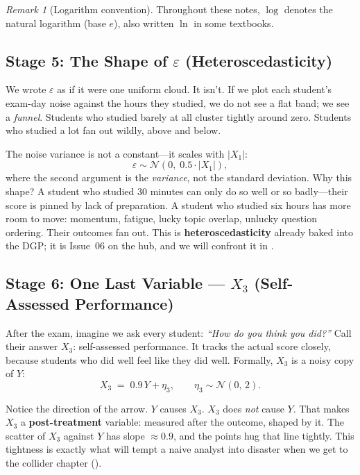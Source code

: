 \documentclass[11pt,a4paper]{article}
\theoremstyle{definition}
\theoremstyle{plain}
\theoremstyle{remark}
\newtheorem{remark}{Remark}[section]
\begin{document}
\begin{remark}[Logarithm convention]
Throughout these notes, $\log$ denotes the natural logarithm (base $e$), also written $\ln$ in some textbooks.
\end{remark}

\subsection{Stage 5: The Shape of $\varepsilon$ (Heteroscedasticity)}\label{subsec:stage-eps}

We wrote $\varepsilon$ as if it were one uniform cloud. It isn't. If we plot each student's exam-day noise against the hours they studied, we do not see a flat band; we see a \emph{funnel}. Students who studied barely at all cluster tightly around zero. Students who studied a lot fan out wildly, above and below.

The noise variance is not a constant---it scales with $|X_1|$:
\begin{equation}\label{eq:eps}
  \varepsilon \sim \mathcal{N}\!\left(0,\; 0.5 \cdot |X_1|\right),
\end{equation}
where the second argument is the \emph{variance}, not the standard deviation. Why this shape? A student who studied 30 minutes can only do so well or so badly---their score is pinned by lack of preparation. A student who studied six hours has more room to move: momentum, fatigue, lucky topic overlap, unlucky question ordering. Their outcomes fan out. This is \textbf{heteroscedasticity} already baked into the DGP; it is Issue~06 on the hub, and we will confront it in .

\subsection{Stage 6: One Last Variable --- $X_3$ (Self-Assessed Performance)}\label{subsec:stage-X3}

After the exam, imagine we ask every student: \emph{``How do you think you did?''} Call their answer $X_3$: self-assessed performance. It tracks the actual score closely, because students who did well feel like they did well. Formally, $X_3$ is a noisy copy of $Y$:
\begin{equation}\label{eq:X3}
  X_3 \;=\; 0.9\,Y + \eta_3, \qquad \eta_3 \sim \mathcal{N}(0,\, 2).
\end{equation}

Notice the direction of the arrow. $Y$ causes $X_3$. $X_3$ does \emph{not} cause $Y$. That makes $X_3$ a \textbf{post-treatment} variable: measured after the outcome, shaped by it. The scatter of $X_3$ against $Y$ has slope $\approx 0.9$, and the points hug that line tightly. This tightness is exactly what will tempt a naive analyst into disaster when we get to the collider chapter ().
\end{document}
